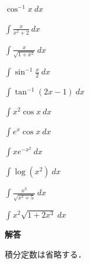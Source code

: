 \documentclass[10pt, uplatex, dvipdfmx]{jsarticle}
\theoremstyle{definition}
\numberwithin{equation}{section}
\newcommand{\ds}{\displaystyle}
\begin{document}
\begin{edaenumerate}
\item $\ds \cos^{-1}x \ dx$

\item $\ds \int \frac{x}{x^2+2} \ dx$

\item $\ds \int \frac{x}{\sqrt{1+x^2}} \ dx$

\item $\ds \int \sin^{-1} \frac{x}{2} \ dx$

\item $\ds \int \tan^{-1} (2x-1) \ dx$

\item $\ds \int x^2 \cos x \ dx$

\item $\ds \int e^x \cos x \ dx$

\item $\ds \int x e^{-x^2} \ dx$

\item $\ds \int \log(x^2) \ dx$

\item $\ds \int \frac{x^3}{\sqrt{x^2+5}} \ dx$

\item $\ds \int x^2 \sqrt{1+2x^3} \ dx$
    
\end{edaenumerate}

\newpage


\begin{center}
  \textbf{解答}
\end{center}
積分定数は省略する．

\vspace{1zh}
\end{document}
